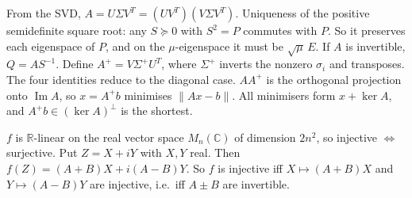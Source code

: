 \documentclass[11pt,a4paper]{article}
\begin{document}
From the SVD, \(A=U\Sigma V^T=(UV^T)(V\Sigma V^T)\). Uniqueness of the positive semidefinite square root: any \(S\succeq0\) with \(S^2=P\) commutes with \(P\). So it preserves each eigenspace of \(P\), and on the \(\mu\)-eigenspace it must be \(\sqrt\mu\,E\). If \(A\) is invertible, \(Q=AS^{-1}\).
Define \(A^+=V\Sigma^+U^T\), where \(\Sigma^+\) inverts the nonzero \(\sigma_i\) and transposes. The four identities reduce to the diagonal case. \(AA^+\) is the orthogonal projection onto \(\operatorname{Im}A\), so \(x=A^+b\) minimises \(\|Ax-b\|\). All minimisers form \(x+\ker A\), and \(A^+b\in(\ker A)^\perp\) is the shortest.

\(f\) is \(\mathbb R\)-linear on the real vector space \(M_n(\mathbb C)\) of dimension \(2n^2\), so injective \(\iff\) surjective.
Put \(Z=X+iY\) with \(X,Y\) real. Then \(f(Z)=(A+B)X+i(A-B)Y\). So \(f\) is injective iff \(X\mapsto(A+B)X\) and \(Y\mapsto(A-B)Y\) are injective, i.e.\ iff \(A\pm B\) are invertible.
\end{document}
